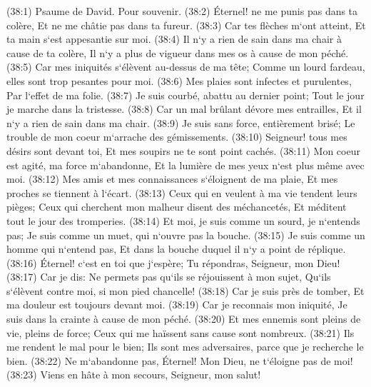 \verse (38:1) Psaume de David. Pour souvenir. (38:2) Éternel! ne me punis pas dans ta colère, Et ne me châtie pas dans ta fureur. 
\verse (38:3) Car tes flèches m`ont atteint, Et ta main s`est appesantie sur moi. 
\verse (38:4) Il n`y a rien de sain dans ma chair à cause de ta colère, Il n`y a plus de vigueur dans mes os à cause de mon péché. 
\verse (38:5) Car mes iniquités s`élèvent au-dessus de ma tête; Comme un lourd fardeau, elles sont trop pesantes pour moi. 
\verse (38:6) Mes plaies sont infectes et purulentes, Par l`effet de ma folie. 
\verse (38:7) Je suis courbé, abattu au dernier point; Tout le jour je marche dans la tristesse. 
\verse (38:8) Car un mal brûlant dévore mes entrailles, Et il n`y a rien de sain dans ma chair. 
\verse (38:9) Je suis sans force, entièrement brisé; Le trouble de mon coeur m`arrache des gémissements. 
\verse (38:10) Seigneur! tous mes désirs sont devant toi, Et mes soupirs ne te sont point cachés. 
\verse (38:11) Mon coeur est agité, ma force m`abandonne, Et la lumière de mes yeux n`est plus même avec moi. 
\verse (38:12) Mes amis et mes connaissances s`éloignent de ma plaie, Et mes proches se tiennent à l`écart. 
\verse (38:13) Ceux qui en veulent à ma vie tendent leurs pièges; Ceux qui cherchent mon malheur disent des méchancetés, Et méditent tout le jour des tromperies. 
\verse (38:14) Et moi, je suis comme un sourd, je n`entends pas; Je suis comme un muet, qui n`ouvre pas la bouche. 
\verse (38:15) Je suis comme un homme qui n`entend pas, Et dans la bouche duquel il n`y a point de réplique. 
\verse (38:16) Éternel! c`est en toi que j`espère; Tu répondras, Seigneur, mon Dieu! 
\verse (38:17) Car je dis: Ne permets pas qu`ils se réjouissent à mon sujet, Qu`ils s`élèvent contre moi, si mon pied chancelle! 
\verse (38:18) Car je suis près de tomber, Et ma douleur est toujours devant moi. 
\verse (38:19) Car je reconnais mon iniquité, Je suis dans la crainte à cause de mon péché. 
\verse (38:20) Et mes ennemis sont pleins de vie, pleins de force; Ceux qui me haïssent sans cause sont nombreux. 
\verse (38:21) Ils me rendent le mal pour le bien; Ils sont mes adversaires, parce que je recherche le bien. 
\verse (38:22) Ne m`abandonne pas, Éternel! Mon Dieu, ne t`éloigne pas de moi! 
\verse (38:23) Viens en hâte à mon secours, Seigneur, mon salut! 

\chapter{}

